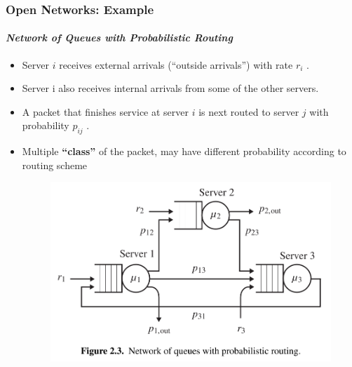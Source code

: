 \documentclass{beamer}
\begin{document}
\begin{frame}
    \frametitle{Open Networks: Example}
    \framesubtitle{\textbf{\textit{Network of Queues with Probabilistic Routing}}}
	\begin{itemize}
		\item Server $i$ receives external arrivals (“outside arrivals”) with rate $r_i$ .
		\item Server i also receives internal arrivals from some of the other servers. 
		\item A packet that finishes service at server $i$ is next routed to server $j$ with 							probability $p_{ij}$ . 
		\item Multiple \textbf{“class”} of the packet, may have different probability according to 			routing scheme
		 \begin{figure}
        		\begin{center}
		            \includegraphics[scale=0.2]{images/Networkqueueswithprobabilisticrouting.jpg}
        		\end{center}
		    \end{figure}
		  
	\end{itemize}	    
    
\end{frame}
\end{document}
